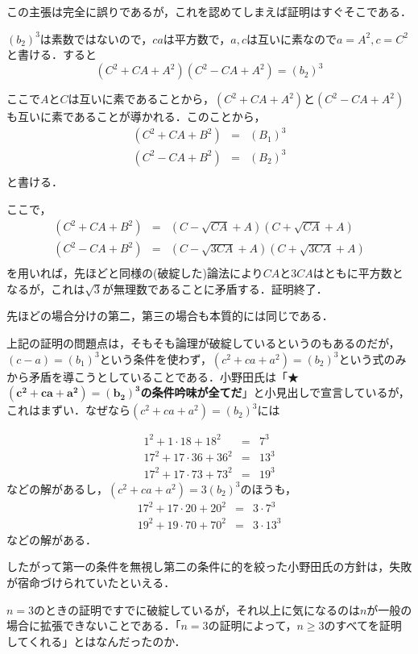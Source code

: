 この主張は完全に誤りであるが，これを認めてしまえば証明はすぐそこである．

$(b_2)^3$は素数ではないので，$ca$は平方数で，$a,c$は互いに素なので$a=A^2,c=C^2$と書ける．すると
\[(C^2+CA+A^2)(C^2-CA+A^2)=(b_2)^3\]

ここで$A$と$C$は互いに素であることから，$(C^2+CA+A^2)$と$(C^2-CA+A^2)$も互いに素であることが導かれる．このことから，
\begin{eqnarray*}
(C^2+CA+B^2)&=&(B_1)^3\\
(C^2-CA+B^2)&=&(B_2)^3\\
\end{eqnarray*}
と書ける．

ここで，
\begin{eqnarray*}
(C^2+CA+B^2)&=&(C-\sqrt{CA}+A)(C+\sqrt{CA}+A)\\
(C^2-CA+B^2)&=&(C-\sqrt{3CA}+A)(C+\sqrt{3CA}+A)\\
\end{eqnarray*}
を用いれば，先ほどと同様の(破綻した)論法により$CA$と$3CA$はともに平方数となるが，これは$\sqrt{3}$が無理数であることに矛盾する．証明終了．

先ほどの場合分けの第二，第三の場合も本質的には同じである．


上記の証明の問題点は，そもそも論理が破綻しているというのもあるのだが，$(c-a)=(b_1)^3$という条件を使わず，$(c^2+ca+a^2)=(b_2)^3$という式のみから矛盾を導こうとしていることである．小野田氏は「★$\mathbf{(c^2+ca+a^2)=(b_2)^3}$\textbf{の条件吟味が全てだ}」と小見出しで宣言しているが，これはまずい．なぜなら$(c^2+ca+a^2)=(b_2)^3$には

\begin{eqnarray*}
1^2+1\cdot 18+ 18^2&=&7^3\\
17^2+17\cdot 36+ 36^2&=&13^3\\
17^2+17\cdot 73+ 73^2&=&19^3
\end{eqnarray*}
などの解があるし，$(c^2+ca+a^2)=3(b_2)^3$のほうも，
\begin{eqnarray*}
17^2+17\cdot 20+ 20^2&=&3\cdot 7^3\\
19^2+19\cdot 70+ 70^2&=&3\cdot 13^3
\end{eqnarray*}
などの解がある．

したがって第一の条件を無視し第二の条件に的を絞った小野田氏の方針は，失敗が宿命づけられていたといえる．

$n=3$のときの証明ですでに破綻しているが，それ以上に気になるのは$n$が一般の場合に拡張できないことである．「$n=3$の証明によって，$n\geq 3$のすべてを証明してくれる」とはなんだったのか．

